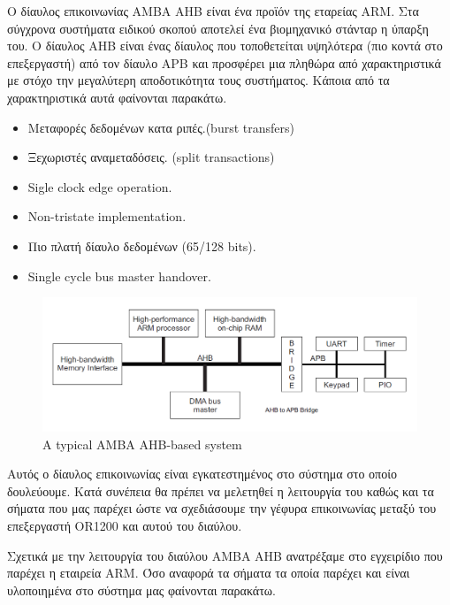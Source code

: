 \documentclass[a4paper,10pt]{article}
\numberwithin{figure}{section}
\numberwithin{table}{section}
\begin{document}
Ο δίαυλος επικοινωνίας AMBA AHB είναι ένα προϊόν της εταρείας ARM. Στα σύγχρονα συστήματα ειδικού σκοπού αποτελεί ένα βιομηχανικό στάνταρ η ύπαρξη του. Ο δίαυλος ΑΗΒ είναι ένας δίαυλος που τοποθετείται υψηλότερα (πιο κοντά στο επεξεργαστή) από τον δίαυλο APB και προσφέρει μια πληθώρα από χαρακτηριστικά με στόχο την μεγαλύτερη αποδοτικότητα τους συστήματος. Κάποια από τα χαρακτηριστικά αυτά φαίνονται παρακάτω.
\begin{itemize}
 \item Μεταφορές δεδομένων κατα ριπές.(burst transfers) 
 \item Ξεχωριστές αναμεταδόσεις. (split transactions)
 \item Sigle clock edge operation.
 \item Non-tristate implementation.
 \item Πιο πλατή δίαυλο δεδομένων (65/128 bits).
 \item Single cycle bus master handover.
\end{itemize}

\vspace{0.7cm}
\begin{figure}[h!]
 \centering
 \includegraphics[bb=0 0 1033 371,scale=0.3]{./Images/AHB.png}
 \caption{A typical AMBA AHB-based system}
\end{figure}

Αυτός ο δίαυλος επικοινωνίας είναι εγκατεστημένος στο σύστημα στο οποίο δουλεύουμε. Κατά συνέπεια θα πρέπει να μελετηθεί η λειτουργία του καθώς και τα σήματα που μας παρέχει ώστε να σχεδιάσουμε την γέφυρα επικοινωνίας μεταξύ του επεξεργαστή ΟR1200 και αυτού του διαύλου.
\newline

Σχετικά με την λειτουργία του διαύλου ΑΜΒΑ ΑΗΒ ανατρέξαμε στο εγχειρίδιο που παρέχει η εταιρεία ARM. Όσο αναφορά τα σήματα τα οποία παρέχει και είναι υλοποιημένα στο σύστημα μας φαίνονται παρακάτω.

\newpage
\end{document}
